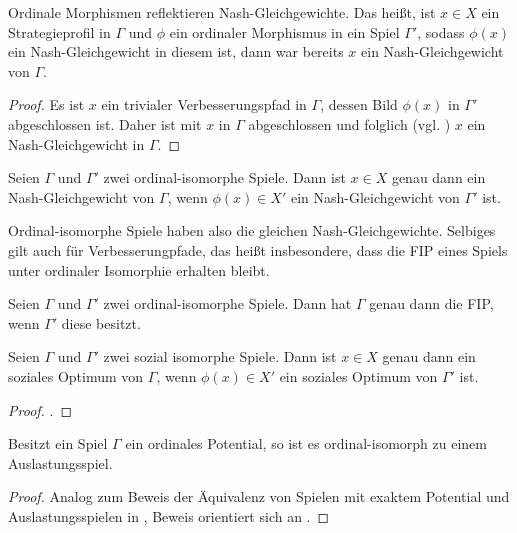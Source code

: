 \begin{kor}
	Ordinale Morphismen reflektieren Nash-Gleichgewichte. Das heißt, ist $x \in X$ ein Strategieprofil in $\Gamma$ und $\phi$ ein ordinaler Morphismus in ein Spiel $\Gamma'$, sodass $\phi(x)$ ein Nash-Gleichgewicht in diesem ist, dann war bereits $x$ ein Nash-Gleichgewicht von $\Gamma$.
\end{kor}

\begin{proof}
	Es ist $x$ ein trivialer Verbesserungspfad in $\Gamma$, dessen Bild $\phi(x)$ in $\Gamma'$ abgeschlossen ist. Daher ist mit   $x$ in $\Gamma$ abgeschlossen und folglich (vgl. ) $x$ ein Nash-Gleichgewicht in $\Gamma$.
\end{proof}

\begin{kor}
	Seien $\Gamma$ und $\Gamma'$ zwei ordinal-isomorphe Spiele. Dann ist $x \in X$ genau dann ein Nash-Gleichgewicht von $\Gamma$, wenn $\phi(x) \in X'$ ein Nash-Gleichgewicht von $\Gamma'$ ist.
\end{kor}

Ordinal-isomorphe Spiele haben also die gleichen Nash-Gleichgewichte. Selbiges gilt auch für Verbesserungpfade, das heißt insbesondere, dass die FIP eines Spiels unter ordinaler Isomorphie erhalten bleibt.

\begin{kor}
	Seien $\Gamma$ und $\Gamma'$ zwei ordinal-isomorphe Spiele. Dann hat $\Gamma$ genau dann die FIP, wenn $\Gamma'$ diese besitzt.
\end{kor}


\begin{lemma}
	Seien $\Gamma$ und $\Gamma'$ zwei sozial isomorphe Spiele. Dann ist $x \in X$ genau dann ein soziales Optimum von $\Gamma$, wenn $\phi(x) \in X'$ ein soziales Optimum von $\Gamma'$ ist.
\end{lemma}

\begin{proof}
	.
	
\end{proof}

\begin{satz}
	Besitzt ein Spiel $\Gamma$ ein ordinales Potential, so ist es ordinal-isomorph zu einem Auslastungsspiel.
\end{satz}

\begin{proof}
	Analog zum Beweis der Äquivalenz von Spielen mit exaktem Potential und Auslastungsspielen in \cite{MonShap}, Beweis orientiert sich an \cite{MultiPotGames}.
\end{proof}

